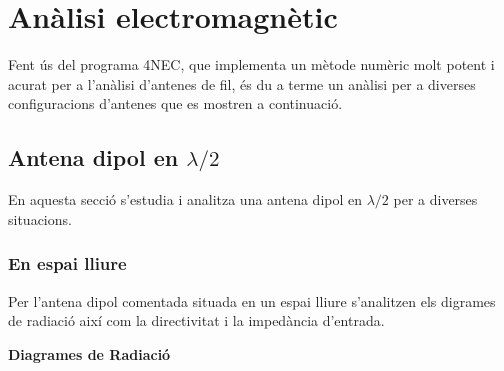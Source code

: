 \chapter{Anàlisi electromagnètic}

Fent ús del programa 4NEC, que implementa un mètode numèric molt potent i acurat per a l'anàlisi d'antenes de fil, és du a terme un anàlisi per a diverses configuracions d'antenes que es mostren a continuació.
\section{Antena dipol en $\lambda/2$}

En aquesta secció s'estudia i analitza una antena dipol en $\lambda/2$ per a diverses situacions.

 \subsection{En espai lliure}

 Per l'antena dipol comentada situada en un espai lliure s'analitzen els digrames de radiació així com la directivitat i la impedància d'entrada.

 	\textbf{Diagrames de Radiació}

